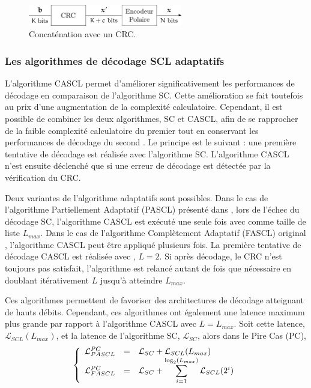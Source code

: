 \begin{figure}[t]
\centering
\includegraphics[width=0.6\textwidth]{main/ch1_fig/crc}
\caption{Concaténation avec un CRC.}
\label{fig:crc}
\end{figure}
\subsubsection{Les algorithmes de décodage SCL adaptatifs}
\label{subsubsec:adaptive}

L'algorithme CASCL permet d'améliorer significativement les performances de décodage en comparaison de l'algorithme SC.
Cette amélioration se fait toutefois au prix d'une augmentation de la complexité calculatoire.
Cependant, il est possible de combiner les deux algorithmes, SC et CASCL, afin de se rapprocher de la faible complexité calculatoire du premier tout en conservant les performances de décodage du second \cite{li_adaptive_2012}.
Le principe est le suivant : une première tentative de décodage est réalisée avec l'algorithme SC. 
L'algorithme CASCL n'est ensuite déclenché que si une erreur de décodage est détectée par la vérification du CRC.

Deux variantes de l'algorithme adaptatifs sont possibles.
Dans le cas de l'algorithme Partiellement Adaptatif (PASCL) présenté dans \cite{sarkis_fast_2016}, lors de l'échec du décodage SC, l'algorithme CASCL est exécuté une seule fois avec comme taille de liste $L_{max}$.
Dans le cas de l'algorithme Complètement Adaptatif (FASCL) original \cite{li_adaptive_2012}, l'algorithme CASCL peut être appliqué plusieurs fois.
La première tentative de décodage CASCL est réalisée avec , $L=2$. Si après décodage, le CRC n'est toujours pas satisfait, l'algorithme est relancé autant de fois que nécessaire en doublant itérativement $L$ jusqu'à atteindre $L_{max}$.



Ces algorithmes permettent de favoriser des architectures de décodage atteignant de hauts débits. Cependant, ces algorithmes ont également une latence maximum plus grande par rapport à l'algorithme CASCL avec $L=L_{max}$. Soit cette latence, $\mathcal{L}_{SCL}(L_{max})$, et la latence de l'algorithme SC, $\mathcal{L}_{SC}$, alors dans le Pire Cas (PC),
\begin{equation*}
\left\{\begin{array}{l c l}
\mathcal{L}^{PC}_{PASCL} & = &\mathcal{L}_{SC} + \mathcal{L}_{SCL}(L_{max})\\
\mathcal{L}^{PC}_{FASCL} & = &\mathcal{L}_{SC} + \displaystyle\sum_{i=1}^{\log_2(L_{max})}\mathcal{L}_{SCL}(2^i)
 \end{array}\right.
\end{equation*}
